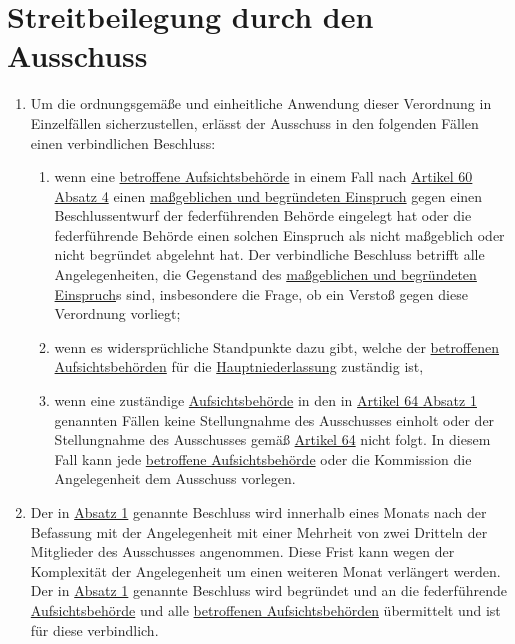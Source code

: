 \chapter{Streitbeilegung durch den Ausschuss}
\label{ch:65}


\begin{enumerate}

  \item Um die ordnungsgemäße und einheitliche Anwendung dieser Verordnung in Einzelfällen sicherzustellen, erlässt der
   Ausschuss in den folgenden Fällen einen verbindlichen Beschluss:
  \label{itm:65-1}

  \begin{enumerate}
  
    \item wenn eine \hyperref[itm:04-22]{betroffene Aufsichtsbehörde} in einem Fall nach \hyperref[itm:60-4]{Artikel 60 Absatz 4} einen
     \hyperref[itm:04-27]{maßgeblichen und begründeten Einspruch} gegen einen Beschlussentwurf der federführenden Behörde eingelegt hat oder
     die federführende Behörde einen solchen Einspruch als nicht maßgeblich oder nicht begründet abgelehnt hat. Der
     verbindliche Beschluss betrifft alle Angelegenheiten, die Gegenstand des \hyperref[itm:04-27]{maßgeblichen und begründeten Einspruch}s
     sind, insbesondere die Frage, ob ein Verstoß gegen diese Verordnung vorliegt;
    \label{itm:65-1a}

    \item wenn es widersprüchliche Standpunkte dazu gibt, welche der \hyperref[itm:04-22]{betroffenen Aufsichtsbehörden} für die
     \hyperref[itm:04-16]{Hauptniederlassung} zuständig ist,
    \label{itm:65-1b}

    \item wenn eine zuständige \hyperref[itm:04-21]{Aufsichtsbehörde} in den in \hyperref[itm:64-1]{Artikel 64 Absatz 1} genannten Fällen
     keine Stellungnahme des Ausschusses einholt oder der Stellungnahme des Ausschusses gemäß \hyperref[ch:64]
     {Artikel 64} nicht folgt. In diesem Fall kann jede \hyperref[itm:04-22]{betroffene Aufsichtsbehörde} oder die Kommission die
     Angelegenheit dem Ausschuss vorlegen.
    \label{itm:65-1c}

  \end{enumerate}

  \item Der in \hyperref[itm:65-1]{Absatz 1} genannte Beschluss wird innerhalb eines Monats nach der Befassung mit der
   Angelegenheit mit einer Mehrheit von zwei Dritteln der Mitglieder des Ausschusses angenommen. Diese Frist kann wegen
   der Komplexität der Angelegenheit um einen weiteren Monat verlängert werden. Der in \hyperref[itm:65-1]{Absatz 1}
   genannte Beschluss wird begründet und an die federführende \hyperref[itm:04-21]{Aufsichtsbehörde} und alle \hyperref[itm:04-22]{betroffenen Aufsichtsbehörden}
   übermittelt und ist für diese verbindlich.
  \label{itm:65-2}


\end{enumerate}
